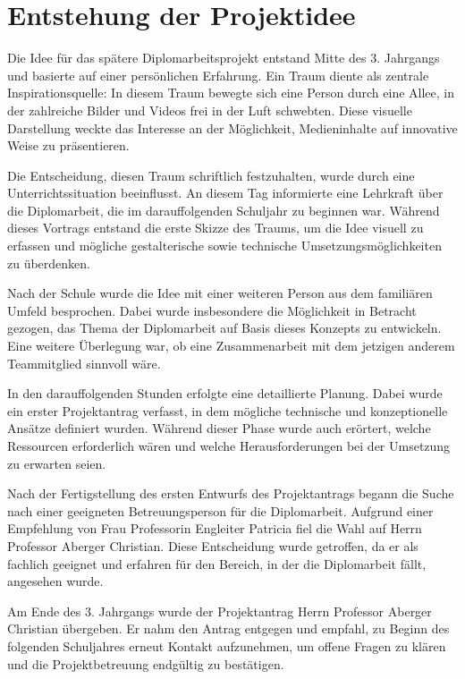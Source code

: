 
\section{Entstehung der Projektidee}


Die Idee für das spätere Diplomarbeitsprojekt entstand Mitte des 3. Jahrgangs 
und basierte auf einer persönlichen Erfahrung. Ein Traum diente als zentrale 
Inspirationsquelle: In diesem Traum bewegte sich eine Person durch eine Allee, 
in der zahlreiche Bilder und Videos frei in der Luft schwebten. Diese visuelle 
Darstellung weckte das Interesse an der Möglichkeit, Medieninhalte auf innovative 
Weise zu präsentieren.

Die Entscheidung, diesen Traum schriftlich festzuhalten, wurde durch eine 
Unterrichtssituation beeinflusst. An diesem Tag informierte eine Lehrkraft 
über die Diplomarbeit, die im darauffolgenden Schuljahr zu beginnen war. Während 
dieses Vortrags entstand die erste Skizze des Traums, um die Idee visuell zu erfassen 
und mögliche gestalterische sowie technische Umsetzungsmöglichkeiten zu überdenken.

Nach der Schule wurde die Idee mit einer weiteren Person aus dem familiären Umfeld 
besprochen. Dabei wurde insbesondere die Möglichkeit in Betracht gezogen, das Thema 
der Diplomarbeit auf Basis dieses Konzepts zu entwickeln. Eine weitere Überlegung war, 
ob eine Zusammenarbeit mit dem jetzigen anderem Teammitglied sinnvoll wäre.

In den darauffolgenden Stunden erfolgte eine detaillierte Planung. Dabei wurde ein 
erster Projektantrag verfasst, in dem mögliche technische und konzeptionelle Ansätze 
definiert wurden. Während dieser Phase wurde auch erörtert, welche Ressourcen 
erforderlich wären und welche Herausforderungen bei der Umsetzung zu erwarten 
seien.

Nach der Fertigstellung des ersten Entwurfs des Projektantrags begann die Suche nach 
einer geeigneten Betreuungsperson für die Diplomarbeit. Aufgrund einer Empfehlung von 
Frau Professorin Engleiter Patricia fiel die Wahl auf Herrn Professor Aberger 
Christian. Diese Entscheidung wurde getroffen, da er als fachlich geeignet und 
erfahren für den Bereich, in der die Diplomarbeit fällt, angesehen wurde.

Am Ende des 3. Jahrgangs wurde der Projektantrag Herrn Professor Aberger Christian 
übergeben. Er nahm den Antrag entgegen und empfahl, zu Beginn des folgenden Schuljahres 
erneut Kontakt aufzunehmen, um offene Fragen zu klären und die Projektbetreuung 
endgültig zu bestätigen.


